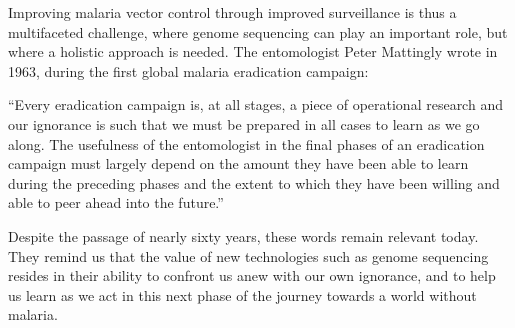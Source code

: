 \documentclass[a4paper,11pt,abstracton,hidelinks]{scrartcl}
\begin{document}
Improving malaria vector control through improved surveillance is thus a multifaceted challenge, where genome sequencing can play an important role, but where a holistic approach is needed.
%
The entomologist Peter Mattingly wrote in 1963, during the first global malaria eradication campaign:


\begin{displayquote}
``Every eradication campaign is, at all stages, a piece of operational research and our ignorance is such that we must be prepared in all cases to learn as we go along. The usefulness of the entomologist in the final phases of an eradication campaign must largely depend on the amount they have been able to learn during the preceding phases and the extent to which they have been willing and able to peer ahead into the future.''
\end{displayquote}


Despite the passage of nearly sixty years, these words remain relevant today.
%
They remind us that the value of new technologies such as genome sequencing resides in their ability to confront us anew with our own ignorance, and to help us learn as we act in this next phase of the journey towards a world without malaria.


\printbibliography
\end{document}
